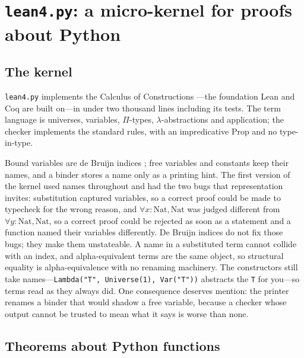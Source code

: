 \documentclass[11pt]{article}
\begin{document}
\section{\texttt{lean4.py}: a micro-kernel for proofs about Python}
\label{sec:lean4}

\subsection{The kernel}

\texttt{lean4.py} implements the Calculus of Constructions
\cite{coquand1988}---the foundation Lean and Coq are built on---in under two
thousand lines including its tests. The term language is universes, variables,
$\Pi$-types, $\lambda$-abstractions and application; the checker implements the
standard rules, with an impredicative \textsf{Prop} and no type-in-type.

Bound variables are de Bruijn indices \cite{debruijn1972}; free variables and
constants keep their names, and a binder stores a name only as a printing hint.
The first version of the kernel used names throughout and had the two bugs
that representation invites: substitution captured variables, so a correct
proof could be made to typecheck for the wrong reason, and $\forall x{:}\mathrm{Nat},
\mathrm{Nat}$ was judged different from $\forall y{:}\mathrm{Nat}, \mathrm{Nat}$, so
a correct proof could be rejected as soon as a statement and a function named
their variables differently. De Bruijn indices do not fix those bugs; they make
them unstateable. A name in a substituted term cannot collide with an index,
and alpha-equivalent terms are the same object, so structural equality is
alpha-equivalence with no renaming machinery. The constructors still take
names---\verb|Lambda("T", Universe(1), Var("T"))| abstracts the \verb|T| for
you---so terms read as they always did. One consequence deserves mention: the
printer renames a binder that would shadow a free variable, because a checker
whose output cannot be trusted to mean what it says is worse than none.

\subsection{Theorems about Python functions}
\end{document}
